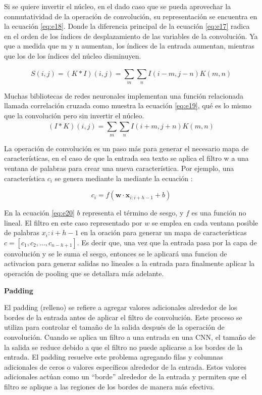 Si se quiere invertir el núcleo, en el dado caso que se pueda aprovechar la conmutatividad de la operación de convolución, su representación se encuentra en la ecuación \ref{eq:e18}. Donde la  diferencia principal de la ecuación \ref{eq:e17} radica en el orden de los índices de desplazamiento de las variables de la convolución. Ya que a medida que m y n aumentan, los índices de la entrada aumentan, mientras que los de los índices del núcleo disminuyen.

\begin{equation} \label{eq:e18} 
	S(i,j)=(K\ast I)(i,j)=\sum_{m}^{}\sum_{n}^{}I(i-m,j-n)K(m,n)
\end{equation}

Muchas bibliotecas de redes neuronales implementan una función relacionada llamada correlación cruzada como muestra la ecuación \ref{eq:e19}, qué es lo mismo que la convolución pero sin invertir el núcleo.
\begin{equation} \label{eq:e19} 
	(I\ast K)(i,j)=\sum_{m}^{}\sum_{n}^{}I(i+m,j+n)K(m,n)
\end{equation}


La operación de convolución es un paso más para generar el necesario mapa de características, en el caso de que la entrada sea texto se  aplica el filtro w a una ventana de palabras  para crear una nueva característica. Por ejemplo, una característica $c_i$ se genera mediante la mediante la ecuación :

\begin{equation} \label{eq:e20} 
	c_i = f(\mathbf{w}\cdot \mathbf{x}_{i:i+h-1} + b)
\end{equation}
 

	
En la ecuación \ref{eq:e20} $b$ representa el término de sesgo, y $f$ es una función no lineal. El filtro en este caso representado por $w$ se emplea en cada ventana posible de palabras $x_i:i+h-1$ en la oración para generar un mapa de características $c=[c_1,c_2,\ldots,c_{n-h+1}]$. Es decir que, una vez que la entrada pasa por la capa de convolución y se le suma el sesgo, entonces se le aplicará una funcion de activacion para generar salidas no lineales a la entrada para finalmente aplicar la operación de pooling que se detallara más adelante.

 \textbf{Padding}
 
 El padding (relleno) se refiere a agregar valores adicionales alrededor de los bordes de la entrada antes de aplicar el filtro de convolución. Este proceso se utiliza para controlar el tamaño de la salida después de la operación de convolución.
Cuando se aplica un filtro a una entrada en una CNN, el tamaño de la salida se reduce debido a que el filtro no puede aplicarse a los bordes de la entrada. El padding resuelve este problema agregando filas y columnas adicionales de ceros o valores específicos alrededor de la entrada. Estos valores adicionales actúan como un ``borde'' alrededor de la entrada y permiten que el filtro se aplique a las regiones de los bordes de manera más efectiva.

